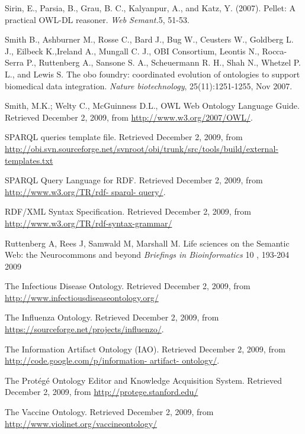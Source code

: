 \documentclass[jou]{ao2e}%
\begin{document}
\begin{thebibliography}{}
 Sirin, E., Parsia, B., Grau, B. C., Kalyanpur, A., and Katz, Y. (2007). Pellet: A practical OWL-DL reasoner. \textit{Web Semant.}5, 51-53. 
 
  Smith B., Ashburner M., Rosse C., Bard J., Bug W., Ceusters W., Goldberg L. J., Eilbeck K.,Ireland A., Mungall C. J., OBI Consortium, Leontis N., Rocca-Serra P., Ruttenberg A., Sansone S. A., Scheuermann R. H., Shah N., Whetzel P. L., and Lewis S. The obo foundry: coordinated evolution of ontologies to support biomedical data integration. \textit{Nature biotechnology}, 25(11):1251-1255, Nov 2007. 
 
  Smith, M.K.; Welty C., McGuinness D.L., OWL Web Ontology Language Guide. Retrieved December 2, 2009, from \url{http://www.w3.org/2007/OWL/}.
 
   SPARQL queries template file. Retrieved December 2, 2009, from \url{http://obi.svn.sourceforge.net/svnroot/obi/trunk/src/tools/build/external-templates.txt}
  
  SPARQL Query Language for RDF. Retrieved December 2, 2009, from \url{http://www.w3.org/TR/rdf- sparql- query/}. 
 
  RDF/XML Syntax Specification. Retrieved December 2, 2009, from \url{http://www.w3.org/TR/rdf-syntax-grammar/}
 
  Ruttenberg A, Rees J, Samwald M, Marshall M. Life sciences on the Semantic Web: the Neurocommons and beyond \textit{Briefings in Bioinformatics} 10 , 193-204 2009
 
  The Infectious Disease Ontology. Retrieved December 2, 2009, from \url{http://www.infectiousdiseaseontology.org/}
 
  The Influenza Ontology. Retrieved December 2, 2009, from \url{https://sourceforge.net/projects/influenzo/}.
 
  The Information Artifact Ontology (IAO). Retrieved December 2, 2009, from \url{http://code.google.com/p/information- artifact- ontology/}.
 
  The Prot\'{e}g\'{e} Ontology Editor and Knowledge Acquisition System. Retrieved December 2, 2009, from \url{http://protege.stanford.edu/}
 
  The Vaccine Ontology. Retrieved December 2, 2009, from \url{http://www.violinet.org/vaccineontology/}





 

 
\end{thebibliography}
    
\end{document}

